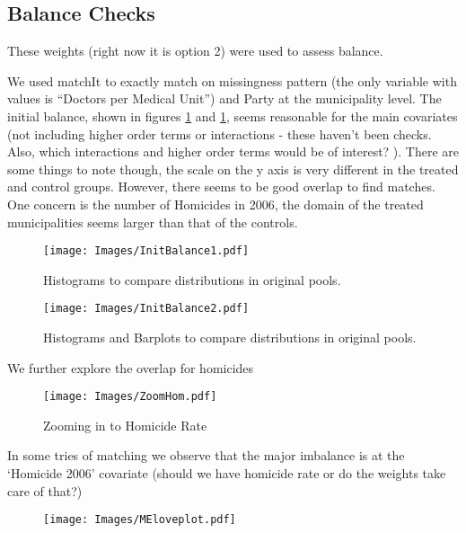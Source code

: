 \documentclass{article}[11 pt]
\begin{document}
\subsection{Balance Checks}
These weights (right now it is option 2) were used to assess balance.

We used matchIt to exactly match on missingness pattern (the only variable with values is ``Doctors per Medical Unit'') and Party at the municipality level. The initial balance, shown in figures \ref{initBalance1} and \ref{initBalance1}, seems reasonable for the main covariates (not including higher order terms or interactions - these haven't been checks. Also, which interactions and higher order terms would be of interest? ). There are some things to note though, the scale on the y axis is very different in the treated and control groups. However, there seems to be good overlap to find matches. One concern is the number of Homicides in 2006, the domain of the treated municipalities seems larger than that of the controls.

\begin{figure}[ht]

    \centering
        \texttt{[image: Images/InitBalance1.pdf]}
\caption{Histograms to compare distributions in original pools.}
\label{initBalance1}
\end{figure}

\begin{figure}[ht]

    \centering
        \texttt{[image: Images/InitBalance2.pdf]}
\caption{Histograms and Barplots  to compare distributions in original pools.}
\label{initBalance2}
\end{figure}

We further explore the overlap for homicides
\begin{figure}[ht]

    \centering
        \texttt{[image: Images/ZoomHom.pdf]}
\caption{Zooming in to Homicide Rate}
\label{ZoomHom}
\end{figure}

In some tries of matching we observe that the major imbalance is at the `Homicide 2006' covariate (should we have homicide rate or do the weights take care of that?)



\begin{figure}[ht]
    \centering
        \texttt{[image: Images/MEloveplot.pdf]}
\end{figure}
\end{document}
